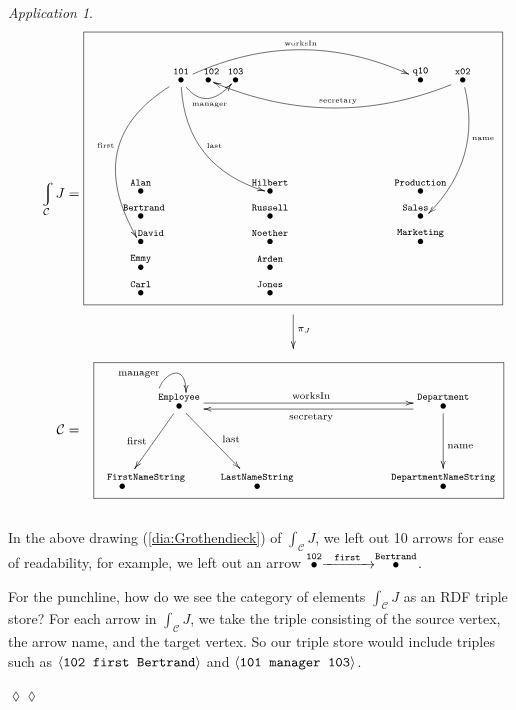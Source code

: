 \documentclass{book}
\def\tn{\textnormal}
\def\mc{\mathcal}
\newcommand{\tin}[1]{\text{\tiny #1}}
\def\la{\langle}
\def\ra{\rangle}
\newcommand{\LTO}[1]{\stackrel{\tt{#1}}{\bullet}}
\newcommand{\Too}[1]{\xrightarrow{\ \ #1\ \ }}
\def\mcC{\mc{C}}
\theoremstyle{remark}
\newtheorem{app}[subsubsection]{Application}
\newenvironment{application}{\begin{app}}{\hspace*{\fill}$\lozenge\lozenge$\end{app}}
\theoremstyle{definition}
\begin{document}
\begin{application}
\begin{align}\label{dia:Grothendieck}
\hspace{0in}\varint_\mcC J=\parbox{3.9in}{
\fbox{
\xymatrix@=.1pt{
&\LTO{101}\ar@/_2.5pc/[ddddl]+<-3pt,3pt>_{\tin{first}}\ar@/_1.5pc/[ddrrr]+<-4pt,0pt>^{\tin{last}}\ar@/_1pc/[rr]+<-3pt,-3pt>_-{\tin{manager}}\ar@/^1.8pc/[rrrrrr]^{\tin{worksIn}}&\LTO{\;\;102}&\LTO{103}&&&&\LTO{q10}&\LTO{x02}\ar@/^1.6pc/[llllll]+<4pt,-2pt>_{\tin{secretary}}\ar@/^1.2pc/[lddd]+<6pt,2pt>^(.4){\tin{name}}\\\parbox{.1in}{~\\\vspace{.6in}~}\\\LTO{Alan}&&&&\LTO{Hilbert}&\hspace{.4in}&\hspace{.4in}&\LTO{Production}\\\LTO{\;\;Bertrand}&&&&\LTO{Russell}&&&\LTO{\hspace{-.1in}Sales}\\\LTO{\hspace{.2in}David}&&&&\LTO{Noether}&&&\LTO{Marketing}\\\LTO{Emmy}&&&&\LTO{Arden}\\\LTO{Carl}&&&&\LTO{Jones}}}\\
\xymatrix{\hspace{1.6in}&\ar[d]^{\pi_J}\\&~}}\\
\nonumber \mcC=\parbox{3.9in}{\hspace{.1in}\fbox{
			\xymatrix@=9pt{&\LTO{Employee}\ar@<.5ex>[rrrrr]^{\tn{worksIn}}\ar@(l,u)[]+<5pt,10pt>^{\tn{manager}}\ar[dddl]_{\tn{first}}\ar[dddr]^{\tn{last}}&&&\hspace{0in}&&\LTO{Department}\ar@<.5ex>[lllll]^{\tn{secretary}}\ar[ddd]^{\tn{name}}\\\\\\\LTO{\parbox{.3in}{\tt \scriptsize FirstNameString}}&&\LTO{LastNameString}&~&~&~&\LTO{DepartmentNameString}
			}}}
\end{align}~\\

In the above drawing (\ref{dia:Grothendieck}) of $\int_\mcC J$, we left out 10 arrows for ease of readability, for example, we left out an arrow $\LTO{102}\Too{\tt first}\LTO{Bertrand}$.

For the punchline, how do we see the category of elements $\int_\mcC J$ as an RDF triple store? For each arrow in $\int_\mcC J$, we take the triple consisting of the source vertex, the arrow name, and the target vertex. So our triple store would include triples such as $\la{\tt 102\;\; first\;\; Bertrand}\ra$ and $\la{\tt 101\;\; manager\;\; 103}\ra$.

\end{application}
\end{document}
